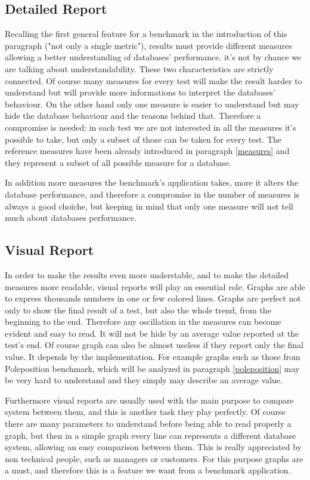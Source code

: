 		\subsection{Detailed Report}
Recalling the first general feature for a benchmark in the introduction of this paragraph ("not only a single metric"), results must provide different measures allowing a better understanding of databases' performance. it's not by chance we are talking about understandability. These two characteristics are strictly connected. Of course many measures for every test will make the result harder to understand but will provide more informations to interpret the databases' behaviour. On the other hand only one measure is easier to understand but may hide the database behaviour and the reasons behind that. Therefore a compromise is needed: in each test we are not interested in all the measures it's possible to take, but only a subset of those can be taken for every test. The reference measures have been already introduced in paragraph \ref{measures} and they represent a subset of all possible measure for a database.

In addition more measures the benchmark's application takes, more it alters the database performance, and therefore a compromise in the number of measures is always a good choiche, but keeping in mind that only one measure will not tell much about databases performance.

		\subsection{Visual Report}
In order to make the results even more understable, and to make the detailed measures more readable, visual reports will play an essential role. Graphs are able to express thousands numbers in one or few colored lines. Graphs are perfect not only to show the final result of a test, but also the whole trend, from the beginning to the end. Therefore any oscillation in the measures can become evident and easy to read. It will not be hide by an average value reported at the test's end. Of course graph can also be almost useless if they report only the final value. It depends by the implementation. For example graphs such as those from Poleposition benchmark, which will be analyzed in paragraph \ref{poleposition} may be very hard to understand and they simply may describe an average value.

Furthermore visual reports are usually used with the main purpose to compare system between them, and this is another task they play perfectly. Of course there are many parameters to understand before being able to read properly a graph, but then in a simple graph every line can represents a different database system, allowing an easy comparison between them. This is really appreciated by non technical people, such as managers or customers. For this purpose graphs are a must, and therefore this is a feature we want from a benchmark application.

